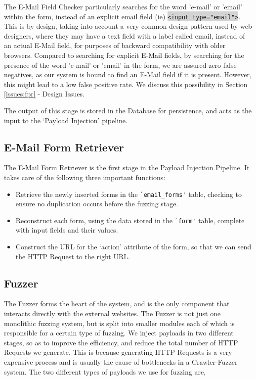 	The E-Mail Field Checker particularly searches for the word 'e-mail' or 'email' within the form, instead of an explicit email field (ie) \colorbox{lightgray}{\lstinline{<input type="email">}}. This is by design, taking into account a very common design pattern used by web designers, where they may have a text field with a label called email, instead of an actual E-Mail field, for purposes of backward compatibility with older browsers. Compared to searching for explicit E-Mail fields, by searching for the presence of the word 'e-mail' or 'email' in the form, we are assured zero false negatives, as our system is bound to find an E-Mail field if it is present. However, this might lead to a low false positive rate. We discuss this possibility in Section \ref*{issues:fpr} - Design Issues. 
	
	The output of this stage is stored in the Database for persistence, and acts as the input to the `Payload Injection' pipeline.
	

\subsection{E-Mail Form Retriever}
	\label{Comp:EMFR}
	The E-Mail Form Retriever is the first stage in the Payload Injection Pipeline. It takes care of the following three important functions:
	\begin{itemize}
		\item Retrieve the newly inserted forms in the \lstinline{`email_forms'} table, checking to ensure no duplication occurs before the fuzzing stage.
		\item Reconstruct each form, using the data stored in the \lstinline{`form'} table, complete with input fields and their values.
		\item Construct the URL for the `action' attribute of the form, so that we can send the HTTP Request to the right URL. 
	\end{itemize}
		
\subsection{Fuzzer}
	\label{Comp:Fuzzer}
	The Fuzzer forms the heart of the system, and is the only component that interacts directly with the external websites. The Fuzzer is not just one monolithic fuzzing system, but is split into smaller modules each of which is responsible for a certain type of fuzzing.  We inject payloads in two different stages, so as to improve the efficiency, and reduce the total number of HTTP Requests we generate. This is because generating HTTP Requests is a very expensive process and is usually the cause of bottlenecks in a Crawler-Fuzzer system.
	The two different types of payloads we use for fuzzing are,
